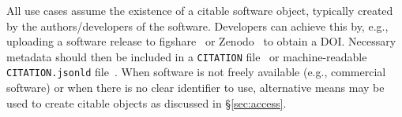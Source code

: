 \documentclass[12pt, oneside]{amsart}
\begin{document}
All use cases assume the existence of a citable software object, typically created by the authors\slash developers of the software.
Developers can achieve this by, e.g., uploading a software release to figshare~\cite{figshare} or Zenodo~\cite{github-citable-code-guide} to obtain a DOI.
Necessary metadata should then be included in a \texttt{CITATION} file~\cite{ssi-citation-files} or machine-readable \texttt{CITATION.jsonld} file~\cite{transitive_credit_json-ld}.
When software is not freely available (e.g., commercial software) or when there is no clear identifier
to use, alternative means may be used to create citable objects as discussed in \S\ref{sec:access}.

\newcommand*\rot[1]{\begin{turn}{90} #1 \end{turn}}%
\end{document}
